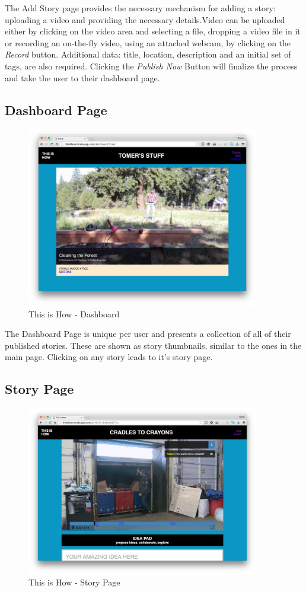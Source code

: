 The Add Story page provides the necessary mechanism for adding a story: uploading a video and providing the necessary details.Video can be uploaded either by clicking on the video area and selecting a file, dropping a video file in it or recording an on-the-fly video, using an attached webcam, by clicking on the \textit{Record} button. Additional data: title, location, description and an initial set of tags, are also required. Clicking the \textit{Publish Now} Button will finalize the process and take the user to their dashboard page. 

\subsection{Dashboard Page}

   \begin{figure}[thpb]
      \centering
      \includegraphics[width=4in]{figures/dashboard.png}
      \caption{This is How - Dashboard}
      \label{fig_dashboard_page}
   \end{figure}

The Dashboard Page is unique per user and presents a collection of all of their published stories. These are shown as story thumbnails, similar to the ones in the main page. Clicking on any story leads to it's story page. 

\subsection{Story Page}

   \begin{figure}[thpb]
      \centering
      \includegraphics[width=4in]{figures/storypage.png}
      \caption{This is How - Story Page}
      \label{fig_dashboard_page}
   \end{figure}

